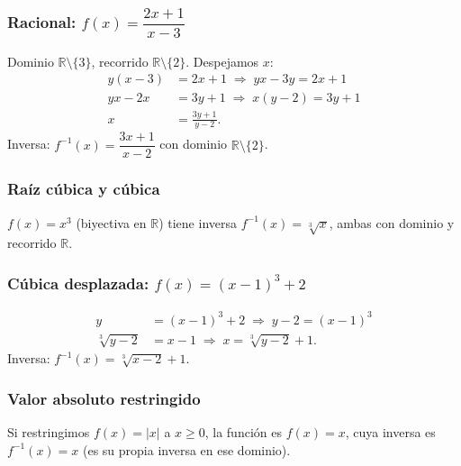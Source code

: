 \documentclass[12pt,a4paper]{article}
\begin{document}
\begin{center}
\end{center}

\subsubsection{Racional: $f(x)=\dfrac{2x+1}{x-3}$}
Dominio $\mathbb{R}\setminus\{3\}$, recorrido $\mathbb{R}\setminus\{2\}$. Despejamos $x$:
\begin{align*}
    y(x-3) &= 2x+1 \;\Rightarrow\; yx - 3y = 2x+1 \\
    yx - 2x &= 3y+1 \;\Rightarrow\; x(y-2) = 3y+1 \\
    x &= \frac{3y+1}{y-2}.
\end{align*}
Inversa: $f^{-1}(x)=\dfrac{3x+1}{x-2}$ con dominio $\mathbb{R}\setminus\{2\}$.

\subsubsection{Raíz cúbica y cúbica}
$f(x)=x^3$ (biyectiva en $\mathbb{R}$) tiene inversa $f^{-1}(x)=\sqrt[3]{x}$, ambas con dominio y recorrido $\mathbb{R}$.

\subsubsection{Cúbica desplazada: $f(x)=(x-1)^3+2$}
\begin{align*}
    y &= (x-1)^3+2 \;\Rightarrow\; y-2 = (x-1)^3 \\
    \sqrt[3]{y-2} &= x-1 \;\Rightarrow\; x = \sqrt[3]{y-2}+1.
\end{align*}
Inversa: $f^{-1}(x)=\sqrt[3]{x-2}+1$.

\subsubsection{Valor absoluto restringido}
Si restringimos $f(x)=|x|$ a $x\geq 0$, la función es $f(x)=x$, cuya inversa es $f^{-1}(x)=x$ (es su propia inversa en ese dominio).
\end{document}
